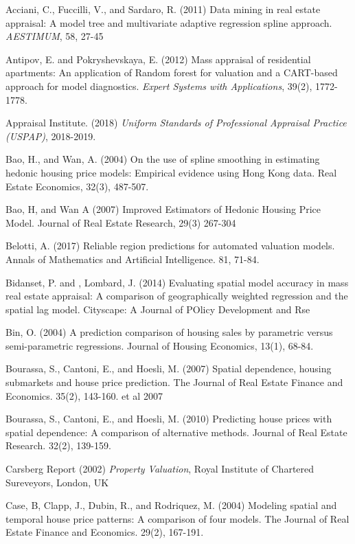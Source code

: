 \documentclass[colTwo]{anon}
\theoremstyle{definition}
\begin{document}
\begin{thebibliography}{50}			
\harvarditem{}{}{}Acciani, C., Fuccilli, V., and Sardaro, R. (2011) Data mining in real estate appraisal: A model tree and multivariate adaptive regression spline approach. \textit{AESTIMUM}, 58, 27-45

\harvarditem{}{}{}Antipov, E. and Pokryshevskaya, E. (2012) Mass appraisal of residential apartments: An application of Random forest for valuation and a CART-based approach for model diagnostics. \textit{Expert Systems with Applications}, 39(2), 1772-1778.

\harvarditem{}{}{}Appraisal Institute. (2018) \textit{Uniform Standards of Professional Appraisal Practice (USPAP)}, 2018-2019.

\harvarditem{}{}{}Bao, H., and Wan, A. (2004) On the use of spline smoothing in estimating hedonic housing price models: Empirical evidence using Hong Kong data. Real Estate Economics, 32(3), 487-507. 

\harvarditem{}{}{}Bao, H, and Wan A (2007) Improved Estimators of Hedonic Housing Price Model. Journal of Real Estate Research, 29(3) 267-304

\harvarditem{}{}{}Belotti, A. (2017) Reliable region predictions for automated valuation models. Annals of Mathematics and Artificial Intelligence. 81, 71-84. 

\harvarditem{}{}{}Bidanset, P. and , Lombard, J. (2014) Evaluating spatial model accuracy in mass real estate appraisal: A comparison of geographically weighted regression and the spatial lag model. Cityscape: A Journal of POlicy Development and Rse

\harvarditem{}{}{}Bin, O. (2004) A prediction comparison of housing sales by parametric versus semi-parametric regressions. Journal of Housing Economics, 13(1), 68-84. 

\harvarditem{}{}{}Bourassa, S., Cantoni, E., and Hoesli, M. (2007) Spatial dependence, housing submarkets and house price prediction. The Journal of Real Estate Finance and Economics. 35(2), 143-160.  et al 2007

\harvarditem{}{}{}Bourassa, S., Cantoni, E., and Hoesli, M. (2010) Predicting house prices with spatial dependence: A comparison of alternative methods. Journal of Real Estate Research. 32(2), 139-159. 

\harvarditem{}{}{}Carsberg Report (2002) \textit{Property Valuation}, Royal Institute of Chartered Sureveyors, London, UK

\harvarditem{}{}{}Case, B, Clapp, J., Dubin, R., and Rodriquez, M. (2004) Modeling spatial and temporal house price patterns: A comparison of four models. The Journal of Real Estate Finance and Economics. 29(2), 167-191. 


\end{thebibliography}
\end{document}
